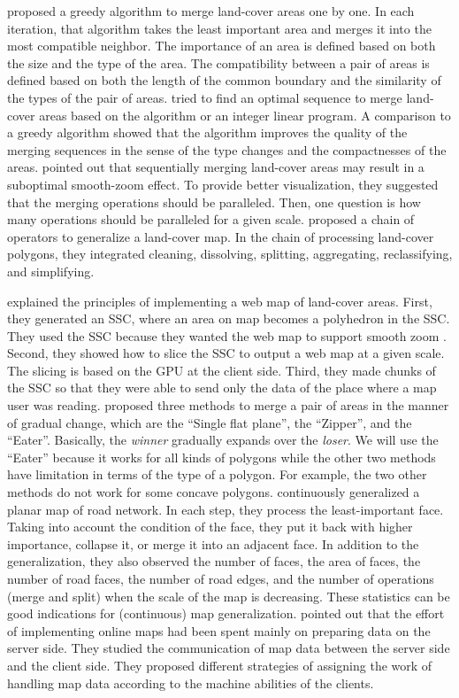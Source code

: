 \documentclass[ijgi,article,submit,moreauthors,pdftex]{Definitions/mdpi}
\begin{document}
\citet{vanOosterom2005} proposed a greedy algorithm 
to merge land-cover areas one by one.
In each iteration, that algorithm takes the least important area and 
merges it into the most compatible neighbor.
The importance of an area is defined 
based on both the size and the type of the area.
The compatibility between a pair of areas is defined based on 
both the length of the common boundary and the similarity of the types 
of the pair of areas. 
\citet[]{Peng2019Thesis} tried to find an optimal sequence 
to merge land-cover areas
based on the \Astar algorithm or an integer linear program.
A comparison to a greedy algorithm showed that 
the \Astar algorithm improves the quality of the merging sequences
in the sense of the type changes and the compactnesses of the areas.
\citet{vanOosterom2014Support} pointed out that sequentially merging
land-cover areas may result in a suboptimal smooth-zoom effect.
To provide better visualization, they suggested that
the merging operations should be paralleled.
Then, one question is how many operations 
should be paralleled for a given scale.
\citet{Thiemann2018LandCover} proposed a chain of operators 
to generalize a land-cover map.
In the chain of processing land-cover polygons, 
they integrated cleaning, dissolving, splitting, aggregating, reclassifying, and simplifying. 


\citet{Meijers2020Web} explained the principles of 
implementing a web map of land-cover areas.
First, they generated an SSC, 
where an area on map becomes a polyhedron in the SSC.
They used the SSC because 
they wanted the web map to support smooth zoom
\citep[see][]{vanOosterom2014Support}.
Second, they showed how to slice the SSC 
to output a web map at a given scale.
The slicing is based on the GPU at the client side.
Third, they made chunks of the SSC 
so that they were able to send only the data of the place
where a map user was reading.
\citet{Suba2014Merge} proposed three methods 
to merge a pair of areas in the manner of gradual change, 
which are the ``Single flat plane'', the ``Zipper'', and the ``Eater''.
Basically, the \emph{winner} gradually expands over the \emph{loser}.
We will use the ``Eater'' because it works for all kinds of polygons 
while the other two methods have limitation 
in terms of the type of a polygon.
For example, the two other methods do not work for some concave polygons.
\citet{Suba2016Road} continuously generalized a planar map of road network.
In each step, they process the least-important face.
Taking into account the condition of the face,
they put it back with higher importance, collapse it, 
or merge it into an adjacent face.
In addition to the generalization, 
they also observed the number of faces,
the area of faces, the number of road faces, the number of road edges,
and the number of operations (merge and split) 
when the scale of the map is decreasing.
These statistics can be good indications 
for (continuous) map generalization.
\citet{Huang2016Webmap} pointed out that
the effort of implementing online maps 
had been spent mainly on preparing data on the server side.
They studied the communication of map data 
between the server side and the client side.
They proposed different strategies of assigning 
the work of handling map data
according to the machine abilities of the clients.
\end{document}
